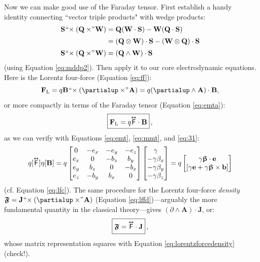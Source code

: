 \documentclass[12pt]{article}
\renewcommand{\vv}[1]{\mathbf{#1}}
\newcommand{\vvbeta}{\bm{\upbeta}}
\newcommand{\capdy}[1]{ \overset{ \text{\tiny$\bm\leftrightarrow$} }{\vphantom{\text{\small{A}}}\smash{#1}} }
\begin{document}
Now we can make good use of the Faraday tensor. First establish a handy identity connecting ``vector triple products" with wedge products:
\begin{equation}\label{eq:vtpi}
\begin{split}
\vv S \mkern1mu `` \mkern-4mu \times (\vv Q \times \mkern-4mu " \mkern1mu \vv W) &= \vv Q ( \vv W \cdot \vv S) - \vv W ( \vv Q \cdot \vv S)  \\[2pt]
&= ( \vv Q \otimes \vv W ) \cdot \vv S - ( \vv W \otimes \vv Q ) \cdot \vv S \\[2pt]
\vv S \mkern1mu `` \mkern-4mu \times (\vv Q \times \mkern-4mu " \mkern1mu \vv W) &= ( \vv Q \wedge \vv W ) \cdot \vv S
\end{split}
\end{equation}
(using Equation \ref{eq:mddp2}). Then apply it to our core electrodynamic equations. Here is the Lorentz four-force (Equation \ref{eq:ff}):
\begin{equation*}
\vv F_{\textrm{L}} = q \vv B \mkern1mu `` \mkern-4mu \times (\partialup \times \mkern-4mu " \mkern1mu \vv A) = q (\partialup \wedge \vv A) \cdot \vv B ,
\end{equation*}
or more compactly in terms of the Faraday tensor (Equation \ref{eq:emta}):
\begin{equation}\label{eq:lfffd}
\boxed{ \vphantom{A_{A_A}} \vv F_{\mathrm{L}} = q \capdy{\mathsf{F}} \cdot \vv B } \, ,
\end{equation}
as we can verify with Equations \ref{eq:emt}, \ref{eq:mmt}, and \ref{eq:31}:
\begin{equation*}
q [\capdy{\mathsf{F}}] \eta [\vv B]
=
q
\begin{bmatrix}
0 & -e_x & -e_y & -e_z \\
e_x & 0 & -b_z & b_y \\
e_y & b_z & 0 & -b_x \\
e_z & -b_y & b_x & 0
\end{bmatrix}
\begin{bmatrix}
\gamma \\
- \gamma \beta_x \\
- \gamma \beta_y \\
- \gamma \beta_z
\end{bmatrix}
=
q
\begin{bmatrix}
\gamma \vvbeta \cdot \vv e \\
[ \gamma \vv e + \gamma \vvbeta \times \vv b ]
\end{bmatrix}
\end{equation*}
(cf. Equation \ref{eq:lfc}). The same procedure for the Lorentz four-force \emph{density} ${\bm{\mathfrak{F}} = \vv J \mkern1mu `` \mkern-4mu \times (\partialup \times \mkern-4mu " \mkern1mu \vv A)}$ (Equation \ref{eq:lffd})---arguably the more fundamental quantity in the classical theory---gives $(\partialup \wedge \vv A) \cdot \vv J$, or:
\begin{equation}\label{eq:lffdfd}
\boxed{ \vphantom{A_{A_{A_A}}} \bm{\mathfrak{F}} = \capdy{\mathsf{F}} \cdot \vv J } \, ,
\end{equation}
whose matrix representation squares with Equation \ref{eq:lorentzforcedensity} (check!).
\end{document}
